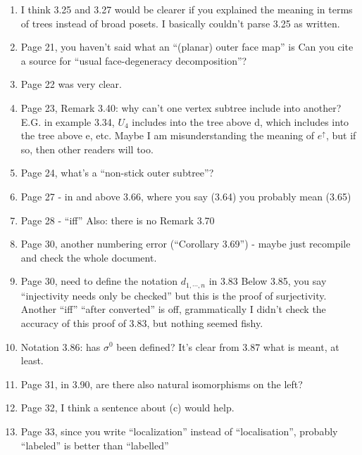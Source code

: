 \documentclass{article}
\begin{document}
\begin{enumerate}
\item
I think 3.25 and 3.27 would be clearer if you explained the meaning in terms of trees instead of broad posets. I basically couldn't parse 3.25 as written. 

\item
Page 21, you haven't said what an ``(planar) outer face map'' is
Can you cite a source for ``usual face-degeneracy decomposition''?

\item
Page 22 was very clear.

\item
Page 23, Remark 3.40: why can't one vertex subtree include into another? E.G. in example 3.34, $U_4$ includes into the tree above d, which includes into the tree above e, etc. Maybe I am misunderstanding the meaning of $e^\uparrow$, but if so, then other readers will too.

\item
Page 24, what's a ``non-stick outer subtree''?

\item
Page 27 - in and above 3.66, where you say (3.64) you probably mean (3.65)

\item
Page 28 - ``iff''
Also: there is no Remark 3.70

\item
Page 30, another numbering error (``Corollary 3.69'') - maybe just recompile and check the whole document.

\item
Page 30, need to define the notation $d_{1,\cdots,n}$ in 3.83
Below 3.85, you say ``injectivity needs only be checked'' but this is the proof of surjectivity.
Another ``iff''
``after converted'' is off, grammatically
I didn't check the accuracy of this proof of 3.83, but nothing seemed fishy.

\item
Notation 3.86: has $\sigma^0$ been defined?
It's clear from 3.87 what is meant, at least.

\item
Page 31, in 3.90, are there also natural isomorphisms on the left?

\item
Page 32, I think a sentence about (c) would help.

\item
Page 33, since you write ``localization'' instead of ``localisation'', probably ``labeled'' is better than ``labelled''


\end{enumerate}
\end{document}
